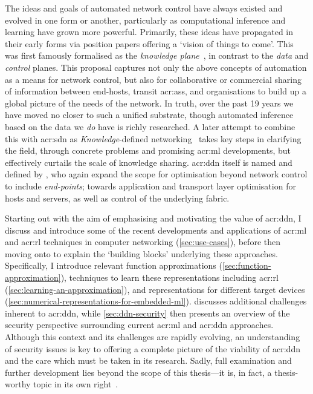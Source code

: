 The ideas and goals of automated network control have always existed and evolved in one form or another, particularly as computational inference and learning have grown more powerful.
Primarily, these ideas have propagated in their early forms via position papers offering a `vision of things to come'.
This was first famously formalised as the \emph{knowledge plane}~\parencite{DBLP:conf/sigcomm/ClarkPRW03}, in contrast to the \emph{data} and \emph{control} planes.
This proposal captures not only the above concepts of automation as a means for network control, but also for collaborative or commercial sharing of information between end-hosts, transit \glspl{acr:as}, and organisations to build up a global picture of the needs of the network.
In truth, over the past \num{19} years we have moved no closer to such a unified substrate, though automated inference based on the data we \emph{do} have is richly researched.
A later attempt to combine this with \gls{acr:sdn} as \emph{Knowledge}-defined networking~\parencite{DBLP:journals/corr/MestresRCBASMMB16} takes key steps in clarifying the field, through concrete problems and promising \gls{acr:ml} developments, but effectively curtails the scale of knowledge sharing.
\gls{acr:ddn} itself is named and defined by \Textcite{DBLP:conf/comsnets/JiangSSZ17}, who again expand the scope for optimisation beyond network control to include \emph{end-points}; towards application and transport layer optimisation for hosts and servers, as well as control of the underlying fabric.


Starting out with the aim of emphasising and motivating the value of \gls{acr:ddn}, I discuss and introduce some of the recent developments and applications of \gls{acr:ml} and \gls{acr:rl} techniques in computer networking (\cref{sec:use-cases}), before then moving onto to explain the `building blocks' underlying these approaches.
Specifically, I introduce relevant function approximations (\cref{sec:function-approximation}), techniques to learn these representations including \gls{acr:rl} (\cref{sec:learning-an-approximation}), and representations for different target devices (\cref{sec:numerical-representations-for-embedded-ml}).
 discusses additional challenges inherent to \gls{acr:ddn}, while \cref{sec:ddn-security} then presents an overview of the security perspective surrounding current \gls{acr:ml} and \gls{acr:ddn} approaches.
Although this context and its challenges are rapidly evolving, an understanding of security issues is key to offering a complete picture of the viability of \gls{acr:ddn} and the care which must be taken in its research.
Sadly, full examination and further development lies beyond the scope of this thesis---it is, in fact, a thesis-worthy topic in its own right~\parencite{papernot-thesis}.

